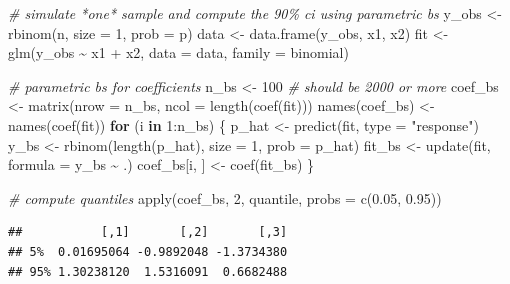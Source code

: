 \documentclass[
]{book}
\newenvironment{Shaded}{\begin{snugshade}}{\end{snugshade}}
\newcommand{\AttributeTok}[1]{\textcolor[rgb]{0.77,0.63,0.00}{#1}}
\newcommand{\CommentTok}[1]{\textcolor[rgb]{0.56,0.35,0.01}{\textit{#1}}}
\newcommand{\ControlFlowTok}[1]{\textcolor[rgb]{0.13,0.29,0.53}{\textbf{#1}}}
\newcommand{\DecValTok}[1]{\textcolor[rgb]{0.00,0.00,0.81}{#1}}
\newcommand{\FloatTok}[1]{\textcolor[rgb]{0.00,0.00,0.81}{#1}}
\newcommand{\FunctionTok}[1]{\textcolor[rgb]{0.00,0.00,0.00}{#1}}
\newcommand{\NormalTok}[1]{#1}
\newcommand{\OtherTok}[1]{\textcolor[rgb]{0.56,0.35,0.01}{#1}}
\newcommand{\SpecialCharTok}[1]{\textcolor[rgb]{0.00,0.00,0.00}{#1}}
\newcommand{\StringTok}[1]{\textcolor[rgb]{0.31,0.60,0.02}{#1}}
\begin{document}
\begin{Shaded}
\begin{Highlighting}[]
\CommentTok{\# simulate *one* sample and compute the 90\% ci using parametric bs}
\NormalTok{y\_obs }\OtherTok{\textless{}{-}} \FunctionTok{rbinom}\NormalTok{(n, }\AttributeTok{size =} \DecValTok{1}\NormalTok{, }\AttributeTok{prob =}\NormalTok{ p)}
\NormalTok{data }\OtherTok{\textless{}{-}} \FunctionTok{data.frame}\NormalTok{(y\_obs, x1, x2)}
\NormalTok{fit }\OtherTok{\textless{}{-}} \FunctionTok{glm}\NormalTok{(y\_obs }\SpecialCharTok{\textasciitilde{}}\NormalTok{ x1 }\SpecialCharTok{+}\NormalTok{ x2, }\AttributeTok{data =}\NormalTok{ data, }\AttributeTok{family =}\NormalTok{ binomial)}

\CommentTok{\# parametric bs for coefficients}
\NormalTok{n\_bs }\OtherTok{\textless{}{-}} \DecValTok{100}  \CommentTok{\# should be 2000 or more}
\NormalTok{coef\_bs }\OtherTok{\textless{}{-}} \FunctionTok{matrix}\NormalTok{(}\AttributeTok{nrow =}\NormalTok{ n\_bs, }\AttributeTok{ncol =} \FunctionTok{length}\NormalTok{(}\FunctionTok{coef}\NormalTok{(fit)))}
\FunctionTok{names}\NormalTok{(coef\_bs) }\OtherTok{\textless{}{-}} \FunctionTok{names}\NormalTok{(}\FunctionTok{coef}\NormalTok{(fit))}
\ControlFlowTok{for}\NormalTok{ (i }\ControlFlowTok{in} \DecValTok{1}\SpecialCharTok{:}\NormalTok{n\_bs) \{}
\NormalTok{  p\_hat }\OtherTok{\textless{}{-}} \FunctionTok{predict}\NormalTok{(fit, }\AttributeTok{type =} \StringTok{"response"}\NormalTok{)}
\NormalTok{  y\_bs }\OtherTok{\textless{}{-}} \FunctionTok{rbinom}\NormalTok{(}\FunctionTok{length}\NormalTok{(p\_hat), }\AttributeTok{size =} \DecValTok{1}\NormalTok{, }\AttributeTok{prob =}\NormalTok{ p\_hat)}
\NormalTok{  fit\_bs }\OtherTok{\textless{}{-}} \FunctionTok{update}\NormalTok{(fit, }\AttributeTok{formula =}\NormalTok{ y\_bs }\SpecialCharTok{\textasciitilde{}}\NormalTok{ .)}
\NormalTok{  coef\_bs[i, ] }\OtherTok{\textless{}{-}} \FunctionTok{coef}\NormalTok{(fit\_bs)}
\NormalTok{\}}

\CommentTok{\# compute quantiles}
\FunctionTok{apply}\NormalTok{(coef\_bs, }\DecValTok{2}\NormalTok{, quantile, }\AttributeTok{probs =} \FunctionTok{c}\NormalTok{(}\FloatTok{0.05}\NormalTok{, }\FloatTok{0.95}\NormalTok{))}
\end{Highlighting}
\end{Shaded}

\begin{verbatim}
##           [,1]       [,2]       [,3]
## 5%  0.01695064 -0.9892048 -1.3734380
## 95% 1.30238120  1.5316091  0.6682488
\end{verbatim}
\end{document}
